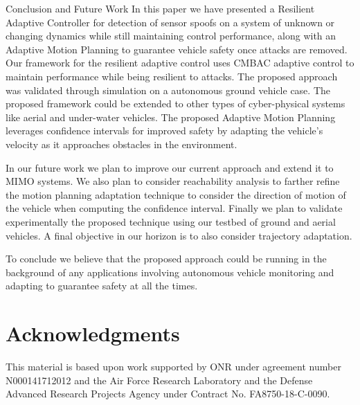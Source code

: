 
\begin{section}{Conclusion and Future Work} \label{sec:conclusion}
In this paper we have presented a Resilient Adaptive Controller for detection of sensor spoofs on a system of unknown or changing dynamics while still maintaining control performance, along with an Adaptive Motion Planning to guarantee vehicle safety once attacks are removed. Our framework for the resilient adaptive control uses CMBAC adaptive control to maintain performance while being resilient to attacks. The proposed approach was validated through simulation on a autonomous ground vehicle case. The proposed framework could be extended to other types of cyber-physical systems like aerial and under-water vehicles. The proposed Adaptive Motion Planning leverages confidence intervals for improved safety by adapting the vehicle's velocity as it approaches obstacles in the environment.

In our future work we plan to improve our current approach and extend it to MIMO systems. We also plan to consider reachability analysis to farther refine the motion planning adaptation technique to consider the direction of motion of the vehicle when computing the confidence interval. Finally we plan to validate experimentally the proposed technique using our testbed of ground and aerial vehicles. A final objective in our horizon is to also consider trajectory adaptation.

To conclude we believe that the proposed approach could be running in the background of any applications involving autonomous vehicle monitoring and adapting to guarantee safety at all the times.


\end{section}

\section*{Acknowledgments} 
This material is based upon work supported by ONR under agreement number N000141712012 and 
the Air Force Research Laboratory and the Defense Advanced Research Projects Agency under Contract No. FA8750-18-C-0090. 



